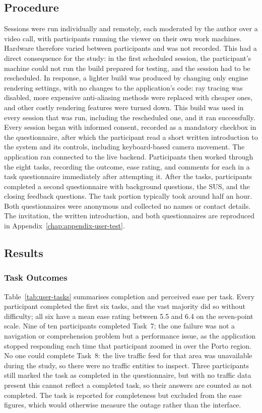 \subsection{Procedure}

Sessions were run individually and remotely, each moderated by the author over a video call, with participants running the viewer on their own work machines. Hardware therefore varied between participants and was not recorded. This had a direct consequence for the study: in the first scheduled session, the participant's machine could not run the build prepared for testing, and the session had to be rescheduled. In response, a lighter build was produced by changing only engine rendering settings, with no changes to the application's code: ray tracing was disabled, more expensive anti-aliasing methods were replaced with cheaper ones, and other costly rendering features were turned down. This build was used in every session that was run, including the rescheduled one, and it ran successfully. Every session began with informed consent, recorded as a mandatory checkbox in the questionnaire, after which the participant read a short written introduction to the system and its controls, including keyboard-based camera movement. The application ran connected to the live backend. Participants then worked through the eight tasks, recording the outcome, ease rating, and comments for each in a task questionnaire immediately after attempting it. After the tasks, participants completed a second questionnaire with background questions, the SUS, and the closing feedback questions. The task portion typically took around half an hour. Both questionnaires were anonymous and collected no names or contact details. The invitation, the written introduction, and both questionnaires are reproduced in Appendix~\ref{chap:appendix-user-test}.

\subsection{Results}
\label{sec:eval-user-results}

\subsubsection*{Task Outcomes}

Table~\ref{tab:user-tasks} summarises completion and perceived ease per task. Every participant completed the first six tasks, and the vast majority did so without difficulty; all six have a mean ease rating between 5.5 and 6.4 on the seven-point scale. Nine of ten participants completed Task~7; the one failure was not a navigation or comprehension problem but a performance issue, as the application stopped responding each time that participant zoomed in over the Porto region. No one could complete Task~8: the live traffic feed for that area was unavailable during the study, so there were no traffic entities to inspect. Three participants still marked the task as completed in the questionnaire, but with no traffic data present this cannot reflect a completed task, so their answers are counted as not completed. The task is reported for completeness but excluded from the ease figures, which would otherwise measure the outage rather than the interface.

